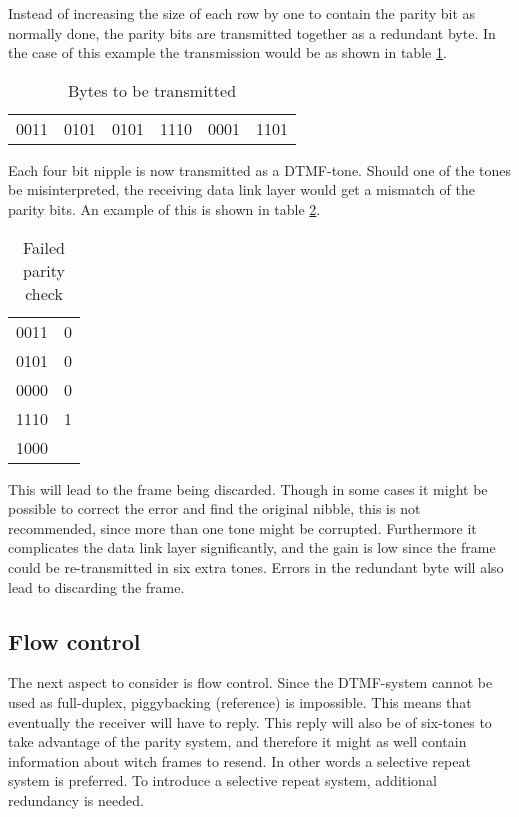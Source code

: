 Instead of increasing the size of each row by one to contain the parity bit as normally done, the parity bits are transmitted together as a redundant byte. In the case of this example the transmission would be as shown in table \ref{tab:bytes_to_be_transmitted}.

\begin{table}[htb]
	\centering
	\begin{tabular}{c|c|c|c|c|c}
	0011 & 0101 & 0101 & 1110 & 0001 & 1101 \\
	\end{tabular}
	\caption{Bytes to be transmitted}
	\label{tab:bytes_to_be_transmitted}
\end{table}

Each four bit nipple is now transmitted as a DTMF-tone. Should one of the tones
be misinterpreted, the receiving data link layer would get a mismatch of the
parity bits. An example of this is shown in table \ref{tab:failed_parity_check}.

\begin{table}[htb]
	\centering
	\begin{tabular}{c|c}
	0011 & 0 \\
	0101 & 0 \\
	0000 & 0 \\
	1110 & 1 \\
	\hline
	1000 & \\
	\end{tabular}
	\caption{Failed parity check}
	\label{tab:failed_parity_check}
\end{table}

This will lead to the frame being discarded. Though in some cases it might be
possible to correct the error and find the original nibble, this is not
recommended, since more than one tone might be corrupted. Furthermore it
complicates the data link layer significantly, and the gain is low since the
frame could be re-transmitted in six extra tones. Errors in the redundant byte
will also lead to discarding the frame.

\subsection{Flow control}
The next aspect to consider is flow control. Since the DTMF-system
cannot be used as full-duplex, piggybacking (reference) is impossible. This
means that eventually the receiver will have to reply. This reply will also
be of six-tones to take advantage of the parity system, and therefore it might
as well contain information about witch frames to resend. In other words a
selective repeat system is preferred. To introduce a selective repeat system,
additional redundancy is needed.

